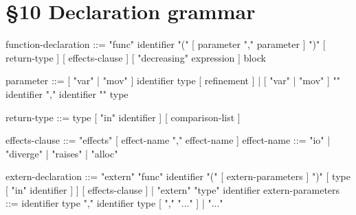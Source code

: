 
\section*{§10 Declaration grammar}
\label{gram:function-declaration}
\begin{grammar}
function-declaration ::= "func" identifier "(" [ parameter { "," parameter } ] ")"
                         [ return-type ] [ effects-clause ]
                         [ "decreasing" expression ] block

parameter            ::= [ "var" | "mov" ] identifier type [ refinement ]
                       | [ "var" | "mov" ] "{" identifier { "," identifier } "}" type

return-type          ::= type [ "in" identifier ] [ comparison-list ]

effects-clause       ::= "effects" [ effect-name { "," effect-name } ]
effect-name          ::= "io" | "diverge" | "raises" | "alloc"           %

extern-declaration   ::= "extern" "func" identifier "(" [ extern-parameters ] ")"
                         [ type [ "in" identifier ] ] [ effects-clause ]
                       | "extern" "type" identifier               %
extern-parameters    ::= identifier type { "," identifier type } [ "," "..." ]
                       | "..."
\end{grammar}

